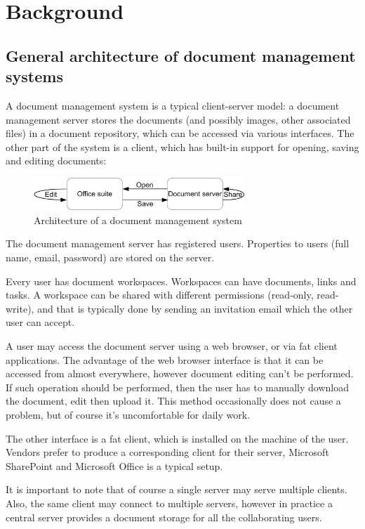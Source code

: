 \section{Background}

\subsection{General architecture of document management systems}

A document management system is a typical client-server model: a document
management server stores the documents (and possibly images, other associated
files) in a document repository, which can be accessed via various interfaces.
The other part of the system is a client, which has built-in support for
opening, saving and editing documents:

\begin{figure}[H]
\centering
\includegraphics[width=300px,keepaspectratio]{general-arch-of-doc-mgmt-systems.pdf}
\caption{Architecture of a document management system}
\end{figure}

The document management server has registered users. Properties to users (full
name, email, password) are stored on the server.

Every user has document workspaces. Workspaces can have documents, links and
tasks. A workspace can be shared with different permissions (read-only,
read-write), and that is typically done by sending an invitation email which
the other user can accept.

A user may access the document server using a web browser, or via fat client
applications. The advantage of the web browser interface is that it can be
accessed from almost everywhere, however document editing can't be performed.
If such operation should be performed, then the user has to manually download
the document, edit then upload it. This method occasionally does not cause a
problem, but of course it's uncomfortable for daily work.

The other interface is a fat client, which is installed on the machine of the
user. Vendors prefer to produce a corresponding client for their server,
Microsoft SharePoint and Microsoft Office is a typical setup.

It is important to note that of course a single server may serve multiple
clients. Also, the same client may connect to multiple servers, however in
practice a central server provides a document storage for all the collaborating
users.

